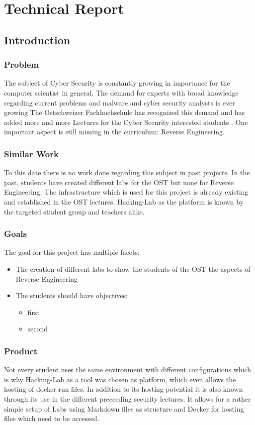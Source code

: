 \chapter{Technical Report}
\section{Introduction}
\subsection{Problem}
The subject of Cyber Security is constantly growing in importance for the computer scientist in general. The demand for experts with broad knowledge regarding current problems and malware and cyber security analysts is ever growing \cite{cybercrime-mag} The Ostschweizer Fachhochschule has recognized this demand and has added more and more Lectures for the Cyber Security interested students \cite{ost-cybersec}. One important aspect is still missing in the curriculum: Reverse Engineering.

\subsection{Similar Work}
To this date there is no work done regarding this subject in past projects. In the past, students have created different labs for the OST but none for Reverse Engineering. The infrastructure which is used for this project is already existing and established in the OST lectures. Hacking-Lab as the platform is known by the targeted student group and teachers alike. 

\subsection{Goals}
The goal for this project has multiple facets:
\begin{itemize}
    \item The creation of different labs to show the students of the OST the aspects of Reverse Engineering
    \item The students should have objectives:
    \begin{itemize}
        \item first
        \item second
    \end{itemize}
\end{itemize}

\subsection{Product}
Not every student uses the same environment with different configurations which is why Hacking-Lab as a tool was chosen as platform, which even allows the hosting of docker run files. In addition to its hosting potential it is also known through its use in the different preceeding security lectures. It allows for a rather simple setup of Labs using Markdown files as structure and Docker for hosting files which need to be accessed.

